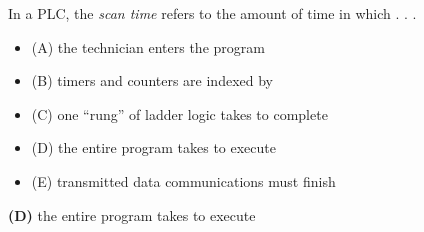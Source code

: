 

In a PLC, the {\it scan time} refers to the amount of time in which . . .

\begin{itemize}
\item{(A)} the technician enters the program
\vskip 5pt 
\item{(B)} timers and counters are indexed by
\vskip 5pt 
\item{(C)} one ``rung'' of ladder logic takes to complete
\vskip 5pt 
\item{(D)} the entire program takes to execute
\vskip 5pt 
\item{(E)} transmitted data communications must finish
\end{itemize}







{\bf (D)} the entire program takes to execute
 










